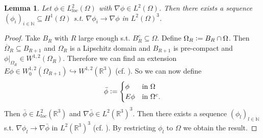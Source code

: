 \documentclass[12pt,a4paper]{article}
\numberwithin{equation}{subsection}
\newtheorem{lemma}{Lemma}[section]
\numberwithin{lemma}{subsection}
\theoremstyle{definition}
\newcommand{\naturalnum}{\mathbb{N}}
\newcommand{\real}{\mathbb{R}}
\begin{document}
\begin{lemma}\label{lem:gradient_sequence}
    Let $\phi \in L^2_{loc}(\Omega)$ with $\nabla \phi \in L^2(\Omega)$. Then 
    there exists a sequence $(\phi_i)_{i \in \naturalnum} \subseteq H^1(\Omega)$
    s.t. $\nabla \phi_i \rightarrow \nabla \phi$ in $L^2(\Omega)^3$.
\end{lemma}
\begin{proof}
    Take $B_R$ with $R$ large enough s.t. $B_R^c \subseteq \Omega$. 
    Define $\Omega_R \vcentcolon= B_R \cap \Omega$. Then 
    $\overline{\Omega}_R \subseteq B_{R+1}$ and $\Omega_R$ is a Lipschitz 
    domain and $B_{R+1}$ is pre-compact and
    $\phi|_{\Omega_R} \in W^{1,2}(\Omega_R)$. Therefore we can find an extension
    $E\phi \in W_0^{1,2}(\Omega_{R+1}) \hookrightarrow W^{1,2}(\mathbb{R}^3)$
    (cf. \cite[Sec.\,1.5.1]{mazya}). So we can now define
    \begin{align*}
    \bar{\phi} \vcentcolon=
    \begin{cases}
        \phi & \mbox{in $\Omega$}\\
        E\phi & \mbox{in $\Omega^c$.}\\
    \end{cases}
    \end{align*}
    Then $\bar{\phi} \in L^2_{loc}(\real^3)$ and 
    $\nabla \bar{\phi} \in L^2(\real^3)^3$. 
    Then there exists a sequence $(\phi_l) _{l \in \naturalnum}$ s.t.
    $\nabla \phi_l \rightarrow \nabla \bar{\phi}$ in $L^2(\real^3)^3$ 
    (cf. \cite[Lemma 1.1]{simader}). By restricting $\phi_l$ to $\Omega$ 
    we obtain the result.
\end{proof}



\end{document}
